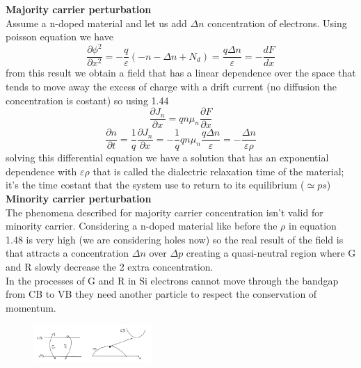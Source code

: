 \vspace{5mm}
{\bf Majority carrier perturbation}\\
Assume a n-doped material and let us add $\Delta n$ concentration of electrons. Using poisson equation we have
\begin{equation}
\frac{\partial \phi^2}{\partial x^2}=-\frac{q}{\varepsilon}\left(-n-\Delta n + N_d\right)=\frac{q\Delta n}{\varepsilon}=-\frac{dF}{dx} 
\end{equation}
from this result we obtain a field that has a linear dependence over the space that tends to move away the excess of charge with a drift current (no diffusion the concentration is costant) so using  1.44
\begin{equation}
\frac{\partial J_n}{\partial x}=qn\mu_n\frac{\partial F}{\partial x}
\end{equation}
\begin{equation}
\frac{\partial n}{\partial t}=\frac{1}{q}\frac{\partial J_n}{\partial x}=-\frac{1}{q}qn\mu_n\frac{q\Delta n}{\varepsilon}=-\frac{\Delta n}{\varepsilon \rho}
\end{equation}
solving this differential equation we have a solution that has an exponential dependence with $\varepsilon \rho$ that is called the dialectric relaxation time of the material; it's the time costant that the system use to return to its equilibrium ($\simeq ps$)\\

\vspace{5mm}
{\bf Minority carrier perturbation}\\
The phenomena described for majority carrier concentration isn't valid for minority carrier. Considering a n-doped material like before the $\rho$ in equation 1.48 is very high (we are considering holes now) so the real result of the field is that attracts a concentration $\Delta n$ over $\Delta p$ creating a quasi-neutral region where G and R slowly decrease the 2 extra concentration.\\
In the processes of G and R in Si electrons cannot move 
through the bandgap from CB to VB they need another particle to respect the conservation of momentum.\\

\begin{figure}
\includegraphics[width=0.4\textwidth]{srhp1.png}
\end{figure}


